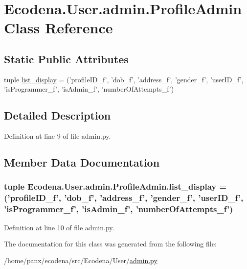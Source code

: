 \hypertarget{class_ecodena_1_1_user_1_1admin_1_1_profile_admin}{
\section{Ecodena.User.admin.ProfileAdmin Class Reference}
\label{d6/d4f/class_ecodena_1_1_user_1_1admin_1_1_profile_admin}
}
\subsection*{Static Public Attributes}
\begin{DoxyCompactItemize}
\item 
tuple \hyperlink{class_ecodena_1_1_user_1_1admin_1_1_profile_admin_ae14c486a9ecf67619995a98610dfc1be}{list\_\-display} = ('profileID\_\-f', 'dob\_\-f', 'address\_\-f', 'gender\_\-f', 'userID\_\-f', 'isProgrammer\_\-f', 'isAdmin\_\-f', 'numberOfAttempts\_\-f')
\end{DoxyCompactItemize}


\subsection{Detailed Description}


Definition at line 9 of file admin.py.



\subsection{Member Data Documentation}
\hypertarget{class_ecodena_1_1_user_1_1admin_1_1_profile_admin_ae14c486a9ecf67619995a98610dfc1be}{
\subsubsection[{list\_\-display}]{\setlength{\rightskip}{0pt plus 5cm}tuple {\bf Ecodena.User.admin.ProfileAdmin.list\_\-display} = ('profileID\_\-f', 'dob\_\-f', 'address\_\-f', 'gender\_\-f', 'userID\_\-f', 'isProgrammer\_\-f', 'isAdmin\_\-f', 'numberOfAttempts\_\-f')}}
\label{d6/d4f/class_ecodena_1_1_user_1_1admin_1_1_profile_admin_ae14c486a9ecf67619995a98610dfc1be}


Definition at line 10 of file admin.py.



The documentation for this class was generated from the following file:\begin{DoxyCompactItemize}
\item 
/home/panx/ecodena/src/Ecodena/User/\hyperlink{_user_2admin_8py}{admin.py}\end{DoxyCompactItemize}
